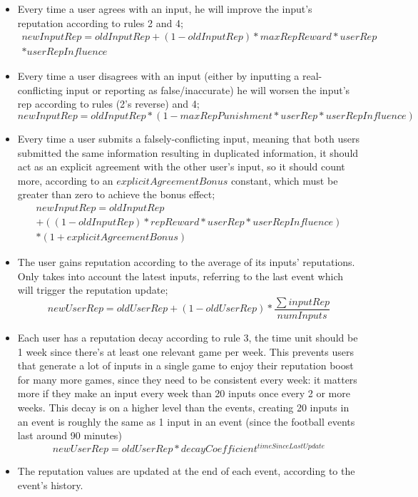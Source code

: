 \begin{itemize}
    \item Every time a user agrees with an input, he will improve the input's reputation according to rules 2 and 4;
    \begin{multline}
        newInputRep = oldInputRep + (1 - oldInputRep) * maxRepReward * userRep\\ * userRepInfluence
    \end{multline}
    \item Every time a user disagrees with an input (either by inputting a real-conflicting input or reporting as false/inaccurate) he will worsen the input's rep according to rules (2's reverse) and 4;
    \begin{equation}
        newInputRep = oldInputRep * (1 - maxRepPunishment * userRep * userRepInfluence)
    \end{equation}
    \item Every time a user submits a falsely-conflicting input, meaning that both users submitted the same information resulting in duplicated information, it should act as an explicit agreement with the other user's input, so it should count more, according to an $explicitAgreementBonus$ constant, which must be greater than zero to achieve the bonus effect;
    \begin{multline}
    newInputRep = oldInputRep \\+ ((1 - oldInputRep) * repReward * userRep * userRepInfluence)\\ * (1 + explicitAgreementBonus)
    \end{multline}
    \item The user gains reputation according to the average of its inputs' reputations. Only takes into account the latest inputs, referring to the last event which will trigger the reputation update;
    \begin{equation}
        newUserRep = oldUserRep + (1 - oldUserRep) * \frac{\sum inputRep}{numInputs}
    \end{equation}
    \item Each user has a reputation decay according to rule 3, the time unit should be 1 week since there's at least one relevant game per week. This prevents users that generate a lot of inputs in a single game to enjoy their reputation boost for many more games, since they need to be consistent every week: it matters more if they make an input every week than 20 inputs once every 2 or more weeks.
    This decay is on a higher level than the events, creating 20 inputs in an event is roughly the same as 1 input in an event (since the football events last around 90 minutes)
    \begin{equation}
        newUserRep = oldUserRep * decayCoefficient^{timeSinceLastUpdate}
    \end{equation}
    \item The reputation values are updated at the end of each event, according to the event's history.
\end{itemize}
